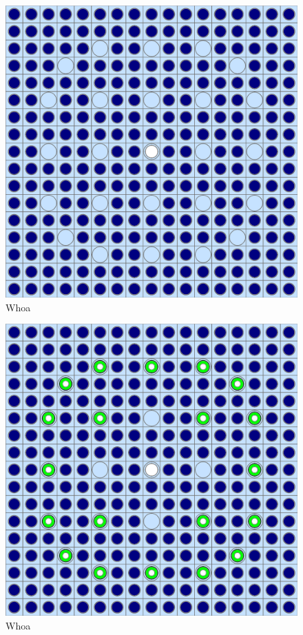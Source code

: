 
\begin{figure}[h!]
  \centering
  \includegraphics[width=0.65\linewidth]{figures/benchmarks/assembly-31}
\caption[BEAVRS 3.1\% enriched assembly]{Whoa}
\label{fig:chap7-assm-31}
\end{figure}

\begin{figure}[h!]
  \centering
  \includegraphics[width=0.65\linewidth]{figures/benchmarks/assembly-31-20BAs}
\caption[BEAVRS 3.1\% enriched assembly with 20 \ac{BP}s]{Whoa}
\label{fig:chap7-assm-31-20BAs}
\end{figure}

